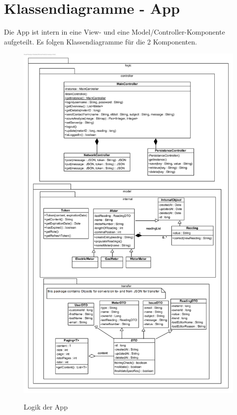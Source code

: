 \section{Klassendiagramme - App}
Die App ist intern in eine View- und eine Model/Controller-Komponente aufgeteilt. Es folgen Klassendiagramme für die 2 Komponenten.
\begin{figure}[H]
\centering
\includegraphics[scale=1.05]{img/diagrams/Android-Class-Diagram-Logic}\\
\caption{Logik der App}
\end{figure}


